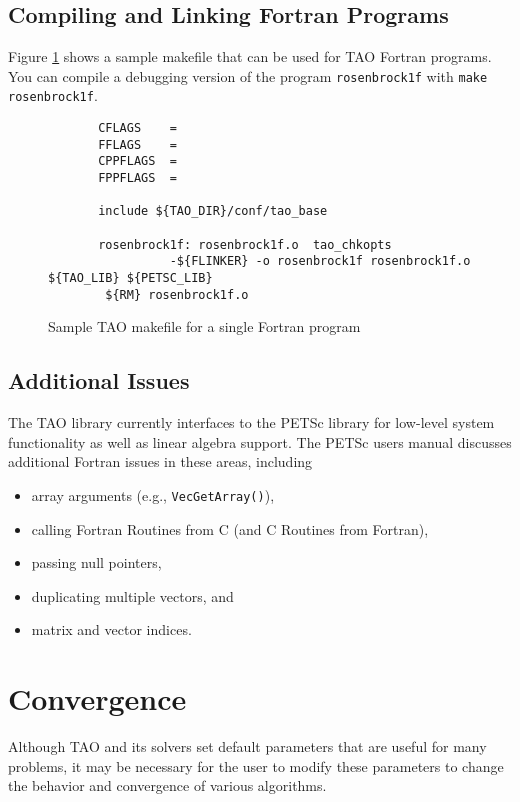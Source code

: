 \subsection{Compiling and Linking Fortran Programs}
\label{sec:fortcompile}

Figure \ref{fig:make4} shows a sample makefile that can be used for
TAO Fortran programs.  You can compile a debugging
version of the program {\tt rosenbrock1f} with 
{\tt make rosenbrock1f}.

\begin{figure}[tbh]
{\footnotesize
\begin{verbatim}   
       CFLAGS    = 
       FFLAGS    = 
       CPPFLAGS  =
       FPPFLAGS  =
       
       include ${TAO_DIR}/conf/tao_base
   
       rosenbrock1f: rosenbrock1f.o  tao_chkopts
                 -${FLINKER} -o rosenbrock1f rosenbrock1f.o ${TAO_LIB} ${PETSC_LIB}
        ${RM} rosenbrock1f.o
\end{verbatim} %
\noindent
}
\caption{Sample TAO makefile for a single Fortran program}
\label{fig:make4}
\end{figure}


\subsection{Additional Issues}

The TAO library currently interfaces to the PETSc library for
low-level system functionality as well as linear algebra support.  The
PETSc users manual discusses additional Fortran issues in these areas,
including
\begin{itemize}
\item array arguments (e.g., {\tt VecGetArray()}),
\item calling Fortran Routines from C (and C Routines from Fortran),
\item passing null pointers,
\item duplicating multiple vectors, and
\item matrix and vector indices.
\end{itemize}




\section{Convergence}\label{sec:customize}

Although TAO and its solvers set default parameters 
that are useful
for many problems, it may be necessary for the user to modify these
parameters to change the behavior and convergence of various algorithms.

